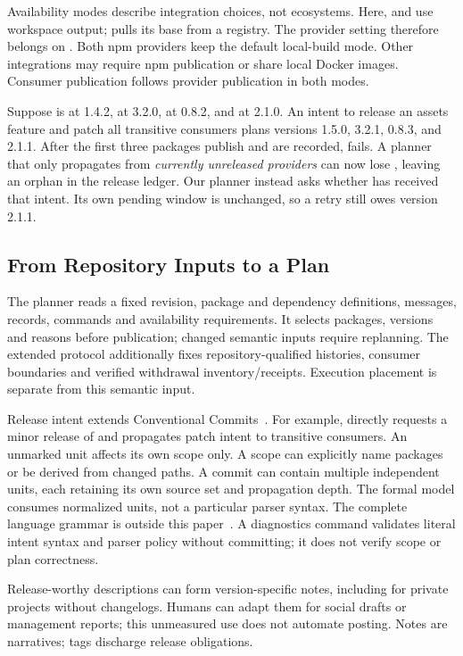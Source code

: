 Availability modes describe integration choices, not ecosystems. Here,
 and  use workspace output;  pulls its base
from a registry. The provider setting 
therefore belongs on . Both npm providers keep the default
local-build mode. Other integrations may require npm publication or share
local Docker images. Consumer publication follows provider publication in
both modes.

Suppose  is at 1.4.2,  at 3.2.0,  at
0.8.2, and  at 2.1.0. An intent to release an assets feature and patch all
transitive consumers plans versions 1.5.0, 3.2.1, 0.8.3, and 2.1.1. After the first
three packages publish and are recorded,  fails. A planner that only
propagates from \emph{currently unreleased providers} can now lose
, leaving an orphan in the release ledger. Our planner instead
asks whether  has received that intent. Its own pending window is
unchanged, so a retry still owes version 2.1.1.

\subsection{From Repository Inputs to a Plan}
\label{sec:ccme}
The planner reads a fixed revision, package and dependency definitions, messages,
records, commands and availability requirements. It selects packages, versions
and reasons before publication; changed semantic inputs require replanning.
The extended protocol additionally fixes repository-qualified histories,
consumer boundaries and verified withdrawal inventory/receipts. Execution
placement is separate from this semantic input.

Release intent extends Conventional Commits~\cite{cc}. For example,
 directly requests a minor
release of  and propagates patch intent to transitive consumers.
An unmarked unit affects its own scope only. A scope can explicitly name
packages or be derived from changed paths. A commit can contain multiple
independent units, each retaining its own source set and propagation depth.
The formal model consumes normalized units, not a particular parser syntax.
The complete language grammar is outside this paper~\cite{ccme2}.
A diagnostics command validates literal intent syntax and parser policy
without committing; it does not verify scope or plan correctness.

Release-worthy descriptions can form version-specific notes, including for
private projects without changelogs. Humans can adapt them for social drafts
or management reports; this unmeasured use does not automate posting.
Notes are narratives; tags discharge release obligations.

